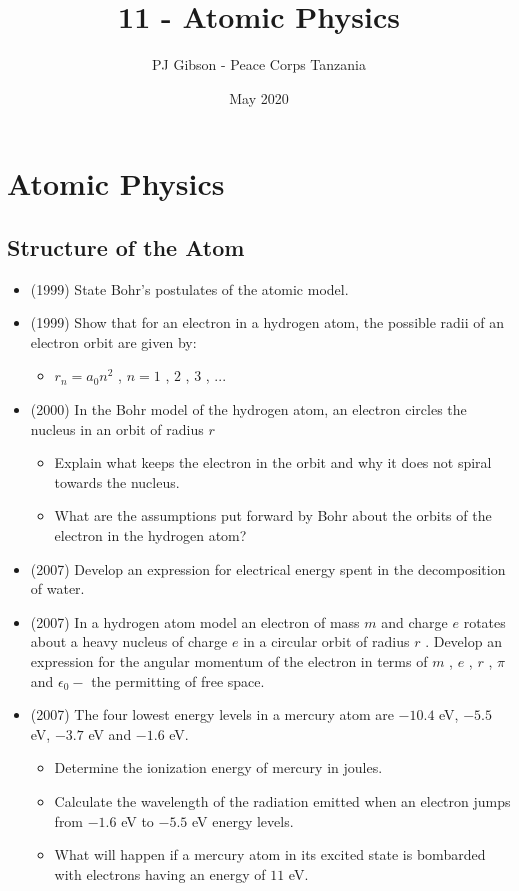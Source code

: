 \documentclass{article}
\title{\textbf{11 - Atomic Physics}}
\author{PJ Gibson - Peace Corps Tanzania}
\date{May 2020}
\newcommand{\mysection}[2]{\setcounter{section}{#1}\addtocounter{section}{-1}\section{#2}}
\begin{document}
\maketitle


\mysection{11}{Atomic Physics}

\subsection{Structure of the Atom}
\begin{itemize}
\item (1999)  State Bohr’s postulates of the atomic model.
\item (1999)  Show that for an electron in a hydrogen atom, the possible radii of an electron orbit are given by:
 \begin{itemize}
\item $ r_{n}=a_{0}n^{2}$ , $ n=1$ , $ 2$ , $ 3$ , ...
\end{itemize}
\item (2000)  In the Bohr model of the hydrogen atom, an electron circles the nucleus in an orbit of radius $ r$
 \begin{itemize}
\item Explain what keeps the electron in the orbit and why it does not spiral towards the nucleus.
\item What are the assumptions put forward by Bohr about the orbits of the electron in the hydrogen atom?
\end{itemize}
\item (2007)  Develop an expression for electrical energy spent in the decomposition of water. 
\item (2007)  In a hydrogen atom model an electron of mass $ m$ and charge $ e$ rotates about a heavy nucleus of charge $ e$ in a circular orbit of radius $ r$ . Develop an expression for the angular momentum of the electron in terms of $ m$ , $ e$ , $ r$ , $ \pi$ and $ \epsilon  _{0}-$ the permitting of free space.
\item (2007)  The four lowest energy levels in a mercury atom are $ -10.4$ eV, $ -5.5$ eV, $ -3.7$ eV and $ -1.6$ eV.
 \begin{itemize}
\item Determine the ionization energy of mercury in joules. 
\item Calculate the wavelength of the radiation emitted when an electron jumps from $ -1.6$ eV to $ -5.5$ eV energy levels. 
\item What will happen if a mercury atom in its excited state is bombarded with electrons having an energy of $ 11$ eV. 

\end{itemize}
\end{itemize}
\end{document}
